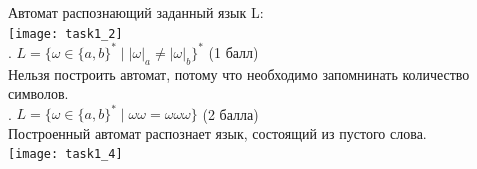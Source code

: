 \documentclass{article}
\begin{document}
\normalsize{Автомат распознающий заданный язык L: }\\
\hfill \break
\texttt{[image: task1\_2]}\\
\hfill \break
\hfill {}. \(L = \{\omega  \in \{a,b\}^* \mid |\omega|_a \neq |\omega|_b\}^*\) (1 балл)\\
\hfill \break
\normalsize{Нельзя построить автомат, потому что необходимо запомнинать количество символов.}\\
\hfill {}. \(L = \{\omega  \in \{a,b\}^* \mid \omega \omega = \omega \omega \omega \}\) (2 балла)\\
\hfill \break
\normalsize{Построенный автомат распознает язык, состоящий из пустого слова.}\\
\hfill \break
\texttt{[image: task1\_4]}\\
\hfill \break
\newpage
\end{document}
